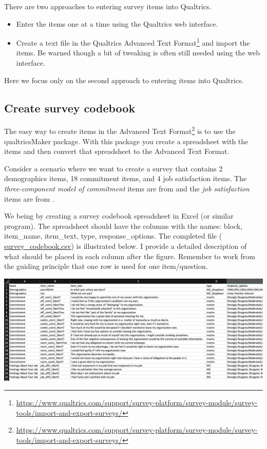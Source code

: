 \documentclass[
]{krantz}
\renewcommand{\href}[2]{#2\footnote{\url{#1}}}
\begin{document}
There are two approaches to entering survey items into Qualtrics.

\begin{itemize}
\item
  Enter the items one at a time using the Qualtrics web interface.
\item
  Create a text file in the Qualtrics \href{https://www.qualtrics.com/support/survey-platform/survey-module/survey-tools/import-and-export-surveys/}{Advanced Text Format} and import the items. Be warned though a bit of tweaking is often still needed using the web interface.
\end{itemize}

Here we focus only on the second approach to entering items into Qualtrics.

\hypertarget{create-survey-codebook}{%
\subsection{Create survey codebook}\label{create-survey-codebook}}

The easy way to create items in the \href{https://www.qualtrics.com/support/survey-platform/survey-module/survey-tools/import-and-export-surveys/}{Advanced Text Format} is to use the qualtricsMaker package. With this package you create a spreadsheet with the items and then convert that spreadsheet to the Advanced Text Format.

Consider a scenario where we want to create a survey that contains 2 demographics items, 18 commitment items, and 4 job satisfaction items. The \emph{three-component model of commitment} items are from \citep{meyer1993commitment} and the \emph{job satisfaction} items are from \citep{thompson2012brief}.

We being by creating a survey codebook spreadsheet in Excel (or similar program). The spreadsheet should have the columns with the names: block, item\_name, item\_text, type, response\_options. The completed file ( \url{survey_codebook.csv}) is illustrated below. I provide a detailed description of what should be placed in each column after the figure. Remember to work from the guiding principle that one row is used for one item/question.

\includegraphics[width=1\linewidth]{ch_qualtrics/images/screenshot_items}
\end{document}

